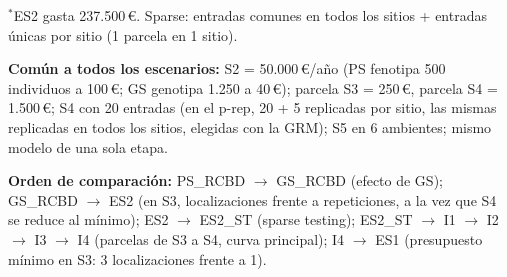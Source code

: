 \documentclass[11pt,a4paper]{article}
\begin{document}
\begin{landscape}
\begin{table}[p]
\vspace{1em}
\begin{minipage}{\linewidth}
\footnotesize
$^{*}$ES2 gasta 237.500\,\euro{}.
Sparse: entradas comunes en todos los sitios + entradas únicas por sitio (1 parcela en 1 sitio).

\textbf{Común a todos los escenarios:} S2 = 50.000\,\euro{}/año (PS fenotipa 500 individuos a 100\,\euro{}; GS genotipa 1.250 a 40\,\euro{}); parcela S3 = 250\,\euro{}, parcela S4 = 1.500\,\euro{};
S4 con 20 entradas (en el p-rep, 20 + 5 replicadas por sitio, las mismas replicadas en todos los sitios, elegidas con la GRM); S5 en 6 ambientes; mismo modelo de una sola etapa.

\vspace{0.5em}
\textbf{Orden de comparación:}
PS\_RCBD $\to$ GS\_RCBD (efecto de GS);
GS\_RCBD $\to$ ES2 (en S3, localizaciones frente a repeticiones, a la vez que S4 se reduce al mínimo);
ES2 $\to$ ES2\_ST (sparse testing);
ES2\_ST $\to$ I1 $\to$ I2 $\to$ I3 $\to$ I4 (parcelas de S3 a S4, curva principal);
I4 $\to$ ES1 (presupuesto mínimo en S3: 3 localizaciones frente a 1).
\end{minipage}
\end{table}
\end{landscape}
\end{document}
